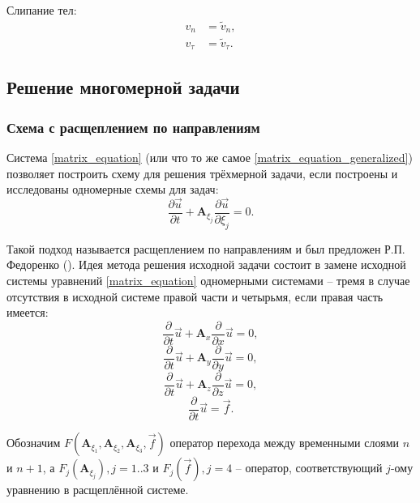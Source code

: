 Слипание тел:
\begin{align}
v_n&=\tilde{v}_n,\nonumber\\
v_\tau&=\tilde{v}_\tau.
\end{align}


\clearpage
\newpage

\subsection{Решение многомерной задачи}

\subsubsection{Схема с расщеплением по направлениям}

Система \ref{matrix_equation} (или что то же самое \ref{matrix_equation_generalized}) позволяет построить схему для решения трёхмерной задачи, если построены и исследованы одномерные схемы для задач:
\begin{equation}
\frac{\partial\vec{u}}{\partial{t}} + \mathbf{A}_{\xi_j} \frac{\partial\vec{u}}{\partial{\xi_j}} = 0.
\end{equation}

Такой подход называется расщеплением по направлениям и был предложен Р.П. Федоренко (\cite{fedorenko}). Идея метода решения исходной задачи состоит в замене исходной системы уравнений \ref{matrix_equation} одномерными системами -- тремя в случае отсутствия в исходной системе правой части и четырьмя, если правая часть имеется:
\begin{equation}
\frac{\partial}{\partial t}\vec u+\mathbf{A}_x \frac{\partial}{\partial x}\vec u = 0,
\label{matrix_equation_x}
\end{equation}
\begin{equation}
\frac{\partial}{\partial t}\vec u+\mathbf{A}_y \frac{\partial}{\partial y}\vec u = 0,
\label{matrix_equation_y}
\end{equation}
\begin{equation}
\frac{\partial}{\partial t}\vec u+\mathbf{A}_z \frac{\partial}{\partial z}\vec u = 0,
\label{matrix_equation_z}
\end{equation}
\begin{equation}
\frac{\partial}{\partial t}\vec u = \vec f.
\label{matrix_equation_f}
\end{equation}

Обозначим $F(\mathbf A_{\xi_1}, \mathbf A_{\xi_2}, \mathbf A_{\xi_3}, \vec f)$ оператор перехода между временными слоями $n$ и $n+1$, а $F_j(\mathbf A_{\xi_j}), j=1..3$ и $F_j(\vec f), j=4$ -- оператор, соответствующий $j$-ому уравнению в расщеплённой системе.

